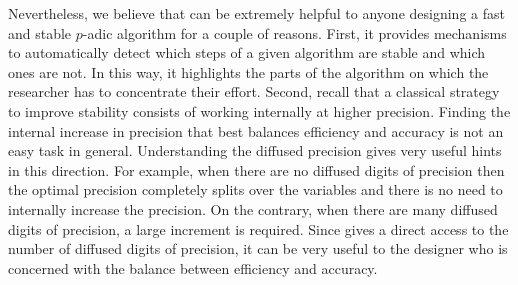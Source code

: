 \documentclass[sigconf]{acmart}
\newcommand{\ZpL}{\text{\color{output} \rm \tt ZpL}\xspace}
\theoremstyle{definition}
\begin{document}
Nevertheless, we believe that \ZpL can be extremely helpful to 
anyone designing a fast and stable $p$-adic algorithm for a couple 
of reasons. First, it provides mechanisms 
to automatically detect which steps of a given algorithm are stable and 
which ones are not. In this way, it highlights the parts of the algorithm 
on which the researcher has to concentrate their effort.
Second, recall that a classical strategy to improve stability consists 
of working internally at higher precision. Finding the internal increase
in precision that best balances efficiency and accuracy is not an easy
task in general. Understanding the diffused 
precision gives very useful hints in this direction. For example, when there are
no diffused digits of precision then the optimal precision completely splits over the
variables and there is no need to internally increase the precision. On 
the contrary, when there are many diffused digits of precision, a large 
increment is required.
Since \ZpL gives a direct access to the number of diffused digits of 
precision, it can be very useful to the designer who is concerned
with the balance between efficiency and accuracy.
\end{document}
